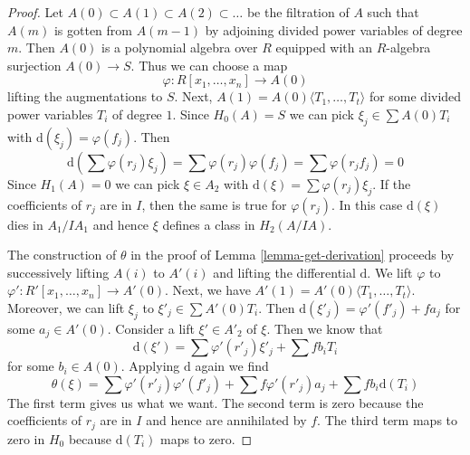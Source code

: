 \documentclass{stacks-project}
\theoremstyle{plain}
\theoremstyle{definition}
\theoremstyle{remark}
\numberwithin{equation}{subsection}
\begin{document}
\begin{proof}
Let $A(0) \subset A(1) \subset A(2) \subset \ldots$ be the filtration
of $A$ such that $A(m)$ is gotten from $A(m - 1)$ by adjoining divided
power variables of degree $m$. Then $A(0)$ is a polynomial algebra
over $R$ equipped with an $R$-algebra surjection $A(0) \to S$.
Thus we can choose a map
$$
\varphi : R[x_1, \ldots, x_n] \to A(0)
$$
lifting the augmentations to $S$.
Next, $A(1) = A(0)\langle T_1, \ldots, T_t \rangle$ for some divided
power variables $T_i$ of degree $1$. Since $H_0(A) = S$ we
can pick $\xi_j \in \sum A(0)T_i$ with $\text{d}(\xi_j) = \varphi(f_j)$.
Then
$$
\text{d}\left(\sum \varphi(r_j) \xi_j\right) =
\sum  \varphi(r_j) \varphi(f_j) =  \sum \varphi(r_jf_j) = 0
$$
Since $H_1(A) = 0$ we can pick $\xi \in A_2$ with
$\text{d}(\xi) = \sum \varphi(r_j) \xi_j$.
If the coefficients of $r_j$ are in $I$, then the same
is true for $\varphi(r_j)$. In this case
$\text{d}(\xi)$ dies in $A_1/IA_1$ and
hence $\xi$ defines a class in $H_2(A/IA)$.

\medskip\noindent
The construction of $\theta$ in the proof of Lemma \ref{lemma-get-derivation}
proceeds by successively lifting $A(i)$ to $A'(i)$ and lifting the
differential $\text{d}$. We lift $\varphi$
to $\varphi' : R'[x_1, \ldots, x_n] \to A'(0)$.
Next, we have $A'(1) = A'(0)\langle T_1, \ldots, T_t\rangle$.
Moreover, we can lift $\xi_j$ to $\xi'_j \in \sum A'(0)T_i$.
Then $\text{d}(\xi'_j) = \varphi'(f'_j) + f a_j$ for some
$a_j \in A'(0)$.
Consider a lift $\xi' \in A'_2$ of $\xi$.
Then we know that
$$
\text{d}(\xi') = \sum \varphi'(r'_j)\xi'_j + \sum fb_iT_i
$$
for some $b_i \in A(0)$. Applying $\text{d}$ again we find
$$
\theta(\xi) = \sum \varphi'(r'_j)\varphi'(f'_j) +
\sum f \varphi'(r'_j) a_j + \sum fb_i \text{d}(T_i)
$$
The first term gives us what we want. The second term is zero
because the coefficients of $r_j$ are in $I$ and hence are
annihilated by $f$. The third term maps to zero in $H_0$
because $\text{d}(T_i)$ maps to zero.
\end{proof}
\end{document}
